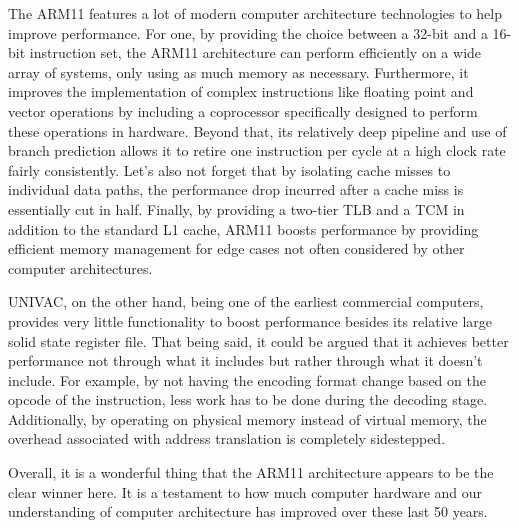 \documentclass[onecolumn, draftclsnofoot, 10pt, compsoc]{IEEEtran}
\newlength{\drop}
\begin{document}
The ARM11 features a lot of modern computer architecture technologies to help improve performance. For one, by providing the choice between a 32-bit and a 16-bit instruction set, the ARM11 architecture can perform efficiently on a wide array of systems, only using as much memory as necessary. Furthermore, it improves the implementation of complex instructions like floating point and vector operations by including a coprocessor specifically designed to perform these operations in hardware. Beyond that, its relatively deep pipeline and use of branch prediction allows it to retire one instruction per cycle at a high clock rate fairly consistently. Let's also not forget that by isolating cache misses to individual data paths, the performance drop incurred after a cache miss is essentially cut in half. Finally, by providing a two-tier TLB and a TCM in addition to the standard L1 cache, ARM11 boosts performance by providing efficient memory management for edge cases not often considered by other computer architectures.

UNIVAC, on the other hand, being one of the earliest commercial computers, provides very little functionality to boost performance besides its relative large solid state register file. That being said, it could be argued that it achieves better performance not through what it includes but rather through what it doesn't include. For example, by not having the encoding format change based on the opcode of the instruction, less work has to be done during the decoding stage. Additionally, by operating on physical memory instead of virtual memory, the overhead associated with address translation is completely sidestepped.

Overall, it is a wonderful thing that the ARM11 architecture appears to be the clear winner here. It is a testament to how much computer hardware and our understanding of computer architecture has improved over these last 50 years.
\newpage


\end{document}
